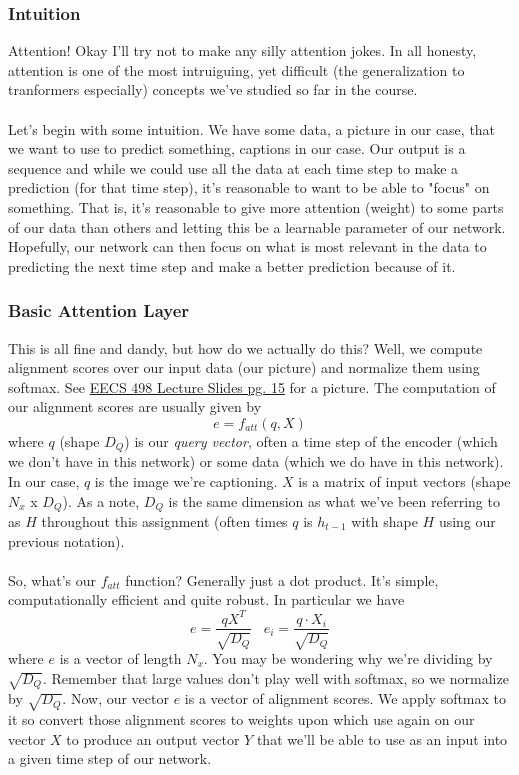 \documentclass[12pt]{article}
\begin{document}
\subsubsection{Intuition}
Attention! Okay I'll try not to make any silly attention jokes. In all honesty, attention is 
one of the most intruiguing, yet difficult (the generalization to tranformers especially) 
concepts we've studied so far in the course. 
~\\
~\\
Let's begin with some intuition. We have some data, a picture in our case, that we want 
to use to predict something, captions in our case. Our output is a sequence and while 
we could use all the data at each time step to make a prediction (for that time step), 
it's reasonable to want to be able to "focus" on something. That is, it's reasonable to 
give more attention (weight) to some parts of our data than others and letting this be 
a learnable parameter of our network. Hopefully, our network can then focus on what is 
most relevant in the data to predicting the next time step and make a better prediction 
because of it. 

\subsubsection{Basic Attention Layer}
This is all fine and dandy, but how do we actually do this? Well, we compute 
alignment scores over our input data (our picture) and normalize them using 
softmax. See \href{https://web.eecs.umich.edu/~justincj/slides/eecs498/498_FA2019_lecture13.pdf}
{EECS 498 Lecture Slides pg. 15} for a picture. The computation of our alignment scores
are usually given by 
\begin{equation*}
    e = f_{att}(q, X)
\end{equation*}
where $q$ (shape $D_Q$) is our \emph{query vector}, often a time step of the encoder (which we don't have in 
this network) or some data (which we do have in this network). In our case, $q$ is the image we're captioning. 
$X$ is a matrix of input vectors (shape $N_x$ x $D_Q$). As a note, $D_Q$ is the same dimension as 
what we've been referring to as $H$ throughout this assignment (often times $q$ is $h_{t-1}$ with shape 
$H$ using our previous notation). 
~\\
~\\
So, what's our $f_{att}$ function? Generally just a dot product. It's simple, computationally
efficient and quite robust. In particular we have 
\begin{equation*}
    e = \frac{q X^T}{\sqrt{D_Q}} \; \; \; e_i = \frac{q \cdot X_i}{\sqrt{D_Q}}
\end{equation*}
where $e$ is a vector of length $N_x$. You may be wondering why we're dividing by $\sqrt{D_Q}$. 
Remember that large values don't play well with softmax, so we normalize by $\sqrt{D_Q}$. Now, 
our vector $e$ is a vector of alignment scores. We apply softmax to it so convert those 
alignment scores to weights upon which use again on our vector $X$ to produce an output vector 
$Y$ that we'll be able to use as an input into a given time step of our network. 

\subsubsection{}
\end{document}
